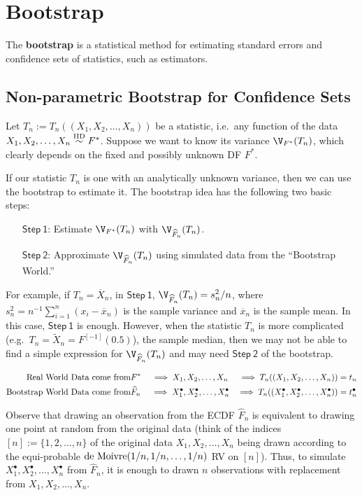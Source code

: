 \chapter{Bootstrap}
The {\bf bootstrap} is a statistical method for estimating standard errors and confidence sets of statistics, such as estimators.

\section{Non-parametric Bootstrap for Confidence Sets}\label{S:NPBootstrap}
Let $T_n := T_n((X_1,X_2,\ldots,X_n))$ be a statistic, i.e.~any function of the data $X_1,X_2,\ldots,X_n \overset{{\rm IID}}{\sim} F^*$.  Suppose we want to know its variance $\V_{F^*}(T_n)$, which clearly depends on the fixed and possibly unknown DF $F^*$.  

If our statistic $T_n$ is one with an analytically unknown variance, then we can use the bootstrap to estimate it.  The bootstrap idea has the following two basic steps:
\begin{enumerate}
\item[$\mathsf{Step~1}$:] Estimate $\V_{F^*}(T_n)$ with $\V_{\widehat{F}_n}(T_n)$.
\item[$\mathsf{Step~2}$:] Approximate $\V_{\widehat{F}_n}(T_n)$ using simulated data from the ``Bootstrap World.'' 
\end{enumerate}
For example, if $T_n=\overline{X}_n$, in $\mathsf{Step~1}$, $\V_{\widehat{F}_n}(T_n) = s_n^2/n$, where $s_n^2=n^{-1} \sum_{i=1}^n (x_i-\overline{x}_n)$ is the sample variance and $\overline{x}_n$ is the sample mean.  In this case,  $\mathsf{Step~1}$ is enough.  However, when the statistic $T_n$ is more complicated (e.g.~$T_n=\widetilde{X}_n = F^{[-1]}(0.5)$), the sample median, then we may not be able to find a simple expression for $\V_{\widehat{F}_n}(T_n)$ and may need $\mathsf{Step~2}$ of the bootstrap.

\begin{eqnarray}
\text{Real World Data come from} &  F^* \quad \implies X_1,X_2,\ldots,X_n & \implies 
T_n((X_1,X_2,\ldots,X_n))=t_n \notag \\
\text{Bootstrap World Data come from} & \widehat{F}_n \quad  \implies X^{\bullet}_1,X^{\bullet}_2,\ldots,X^{\bullet}_n & \implies 
T_n((X^{\bullet}_1,X^{\bullet}_2,\ldots,X^{\bullet}_n))=t^{\bullet}_n \notag
\end{eqnarray}

Observe that drawing an observation from the ECDF $\widehat{F}_n$ is equivalent to drawing one point at random from the original data (think of the indices $[n] := \{ 1,2,\ldots,n \}$ of the original data $X_1,X_2,\ldots,X_n$ being drawn according to the equi-probable $\mbox{{\rm de~Moivre}}(1/n,1/n,\ldots,1/n)$ RV on $[n]$).  Thus, to simulate $X^{\bullet}_1,X^{\bullet}_2,\ldots,X^{\bullet}_n$ from $\widehat{F}_n$, it is enough to drawn $n$ observations with replacement from $X_1,X_2,\ldots,X_n$.

